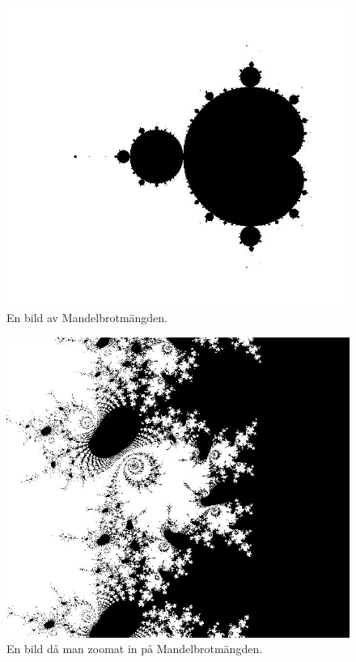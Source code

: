 \documentclass[a4paper]{article}
\begin{document}
\begin{figure}[ht]
\begin{center}
\includegraphics[scale=0.3]{Mandelbrot1.pdf}
\end{center}
\caption{En bild av Mandelbrotmängden.}
\label{Bild 1}
\end{figure}
\begin{figure}
\begin{center}
\includegraphics[scale=0.3]{Mandelbrot3.pdf}
\end{center}
\caption{En bild då man zoomat in på Mandelbrotmängden.}
\label{Bild 2}
\end{figure}
\end{document}
